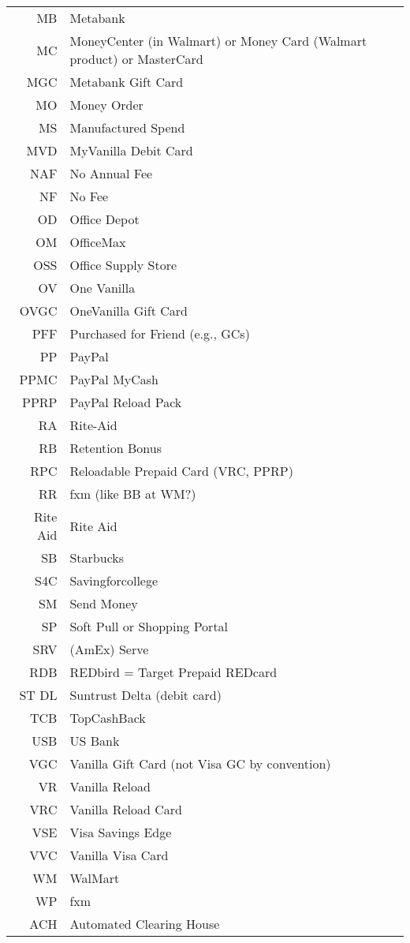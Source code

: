 \documentclass[12pt,twoside]{article}
\begin{document}
\begin{longtable}[>{\bfseries}l]{>{\ttfamily}r l}
MB & Metabank \\
MC & MoneyCenter (in Walmart) or Money Card (Walmart product) or MasterCard \\
MGC & Metabank Gift Card \\
MO & Money Order \\
MS & Manufactured Spend \\
MVD & MyVanilla Debit Card \\
NAF & No Annual Fee \\
NF & No Fee \\
OD & Office Depot \\
OM & OfficeMax \\
OSS & Office Supply Store \\
OV & One Vanilla \\
OVGC & OneVanilla Gift Card \\
PFF & Purchased for Friend (e.g., GCs) \\
PP & PayPal \\
PPMC & PayPal MyCash \\
PPRP & PayPal Reload Pack \\
RA & Rite-Aid \\
RB & Retention Bonus \\
RPC & Reloadable Prepaid Card (VRC, PPRP) \\
RR & fxm (like BB at WM?) \\
Rite Aid & Rite Aid \\
SB & Starbucks \\
S4C & Savingforcollege \\
SM & Send Money \\
SP & Soft Pull or Shopping Portal \\
SRV & (AmEx) Serve \\
RDB & REDbird = Target Prepaid REDcard \\
ST DL & Suntrust Delta (debit card) \\
TCB & TopCashBack \\
USB & US Bank \\
VGC & Vanilla Gift Card (not Visa GC by convention) \\
VR & Vanilla Reload \\
VRC & Vanilla Reload Card \\
VSE & Visa Savings Edge \\
VVC & Vanilla Visa Card \\
WM & WalMart \\
WP & fxm \\
ACH & Automated Clearing House \\

\end{longtable}
\end{document}
